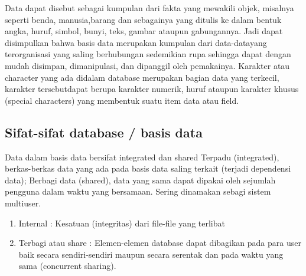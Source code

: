 	Data dapat disebut sebagai kumpulan dari fakta yang mewakili objek, misalnya seperti benda, manusia,barang dan sebagainya yang ditulis ke dalam bentuk angka, huruf, simbol, bunyi, teks, gambar ataupun gabungannya. Jadi dapat disimpulkan bahwa basis data merupakan kumpulan dari data-datayang terorganisasi yang saling berhubungan sedemikian rupa sehingga dapat dengan mudah disimpan, dimanipulasi, dan dipanggil oleh pemakainya. Karakter atau character yang ada didalam database merupakan bagian data yang terkecil, karakter tersebutdapat berupa karakter numerik, huruf ataupun karakter khusus (special characters) yang membentuk suatu item data atau field.

\subsection{Sifat-sifat database / basis data}
	Data dalam basis data bersifat integrated dan shared Terpadu (integrated), berkas-berkas data yang ada pada basis data saling terkait (terjadi dependensi data);
	Berbagi data (shared), data yang sama dapat dipakai oleh sejumlah pengguna dalam waktu yang bersamaan. Sering dinamakan sebagi sistem multiuser.
	\begin{enumerate}
		\item Internal : 
			Kesatuan (integritas) dari file-file yang terlibat

		\item Terbagi atau share : 
			Elemen-elemen database dapat dibagikan pada para user baik secara sendiri-sendiri maupun secara serentak dan pada waktu yang sama (concurrent sharing).
	\end{enumerate}
 
